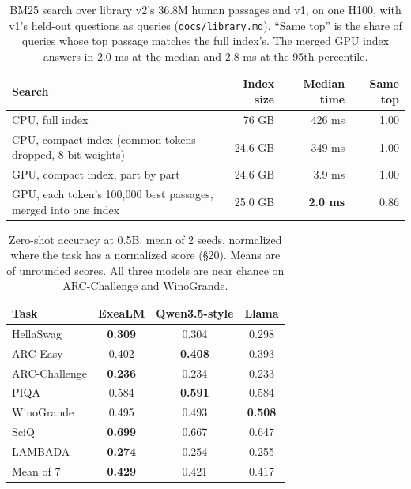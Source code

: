 \documentclass[10pt,twocolumn,letterpaper]{article}
\newcommand{\sect}[1]{\S#1}
\begin{document}
\begin{table}[h]
\centering\small
\caption{BM25 search over library v2's 36.8M human passages and v1, on one H100, with v1's held-out questions as queries (\texttt{docs/library.md}). ``Same top'' is the share of queries whose top passage matches the full index's. The merged GPU index answers in 2.0 ms at the median and 2.8 ms at the 95th percentile.}
\label{tab:search}
\begin{tabular}{@{}l r r r@{}}
\toprule
Search & Index size & Median time & Same top \\
\midrule
CPU, full index & 76 GB & 426 ms & 1.00 \\
CPU, compact index (common tokens dropped, 8-bit weights) & 24.6 GB & 349 ms & 1.00 \\
GPU, compact index, part by part & 24.6 GB & 3.9 ms & 1.00 \\
GPU, each token's 100,000 best passages, merged into one index & 25.0 GB & \textbf{2.0 ms} & 0.86 \\
\bottomrule
\end{tabular}
\end{table}

\begin{table}[h]
\centering\small
\caption{Zero-shot accuracy at 0.5B, mean of 2 seeds, normalized where the task has a normalized score (\sect{20}). Means are of unrounded scores. All three models are near chance on ARC-Challenge and WinoGrande.}
\label{tab:bench}
\setlength{\tabcolsep}{3pt}
\begin{tabular}{@{}l ccc@{}}
\toprule
Task & ExeaLM & Qwen3.5-style & Llama \\
\midrule
HellaSwag \citep{zellers2019hellaswag} & \textbf{0.309} & 0.304 & 0.298 \\
ARC-Easy \citep{clark2018arc} & 0.402 & \textbf{0.408} & 0.393 \\
ARC-Challenge \citep{clark2018arc} & \textbf{0.236} & 0.234 & 0.233 \\
PIQA \citep{bisk2020piqa} & 0.584 & \textbf{0.591} & 0.584 \\
WinoGrande \citep{sakaguchi2020winogrande} & 0.495 & 0.493 & \textbf{0.508} \\
SciQ \citep{welbl2017sciq} & \textbf{0.699} & 0.667 & 0.647 \\
LAMBADA \citep{paperno2016lambada} & \textbf{0.274} & 0.254 & 0.255 \\
\midrule
Mean of 7 & \textbf{0.429} & 0.421 & 0.417 \\
\bottomrule
\end{tabular}
\end{table}
\end{document}

